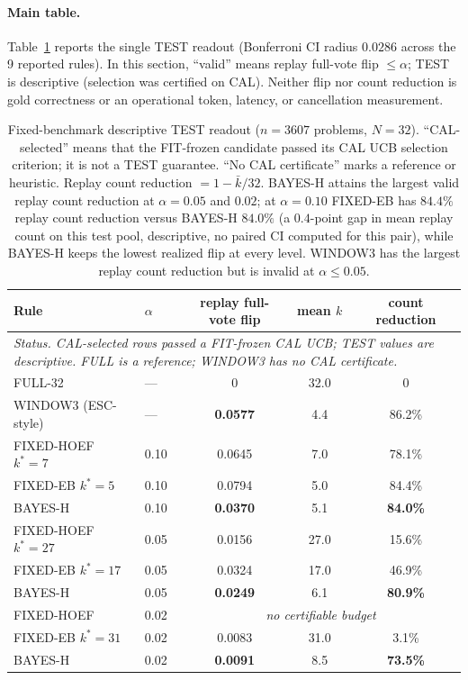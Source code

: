 \documentclass{article}
\theoremstyle{definition}
\theoremstyle{remark}
\begin{document}
\paragraph{Main table.} Table~\ref{tab:main} reports the single TEST readout
(Bonferroni CI radius $0.0286$ across the 9 reported rules). In this section,
``valid'' means replay full-vote flip $\le\alpha$; TEST is descriptive
(selection was certified on CAL). Neither flip nor count reduction is gold
correctness or an operational token, latency, or cancellation measurement.

\begin{table}[t]
\centering\small
\caption{Fixed-benchmark descriptive TEST readout ($n=3607$ problems,
$N=32$). ``CAL-selected'' means that the FIT-frozen candidate passed its CAL
UCB selection criterion; it is not a TEST guarantee. ``No CAL certificate''
marks a reference or heuristic. Replay count reduction $=1-\bar k/32$.
BAYES-H attains the largest valid replay count reduction at $\alpha=0.05$ and $0.02$;
at $\alpha=0.10$ FIXED-EB has $84.4\%$ replay count reduction versus BAYES-H $84.0\%$ (a
$0.4$-point gap in mean replay count on this test pool, descriptive, no paired
CI computed for this pair), while BAYES-H keeps the lowest realized
flip at every level.
WINDOW3 has the largest replay count reduction but is invalid at $\alpha\le0.05$.}
\label{tab:main}
\begin{tabular}{llccc}
\toprule
Rule & $\alpha$ & replay full-vote flip & mean $k$ & count reduction \\
\midrule
\multicolumn{5}{p{0.92\linewidth}}{\textit{Status. CAL-selected rows passed a FIT-frozen CAL UCB; TEST values are descriptive. FULL is a reference; WINDOW3 has no CAL certificate.}} \\
FULL-32 & --- & 0 & 32.0 & 0 \\
WINDOW3 (ESC-style) & --- & \textbf{0.0577} & 4.4 & 86.2\% \\
\midrule
FIXED-HOEF $k^*{=}7$  & 0.10 & 0.0645 & 7.0 & 78.1\% \\
FIXED-EB   $k^*{=}5$  & 0.10 & 0.0794 & 5.0 & 84.4\% \\
BAYES-H               & 0.10 & \textbf{0.0370} & 5.1 & \textbf{84.0\%} \\
\midrule
FIXED-HOEF $k^*{=}27$ & 0.05 & 0.0156 & 27.0 & 15.6\% \\
FIXED-EB   $k^*{=}17$ & 0.05 & 0.0324 & 17.0 & 46.9\% \\
BAYES-H               & 0.05 & \textbf{0.0249} & 6.1 & \textbf{80.9\%} \\
\midrule
FIXED-HOEF & 0.02 & \multicolumn{3}{c}{\emph{no certifiable budget}} \\
FIXED-EB   $k^*{=}31$ & 0.02 & 0.0083 & 31.0 & 3.1\% \\
BAYES-H               & 0.02 & \textbf{0.0091} & 8.5 & \textbf{73.5\%} \\
\bottomrule
\end{tabular}
\end{table}
\end{document}
